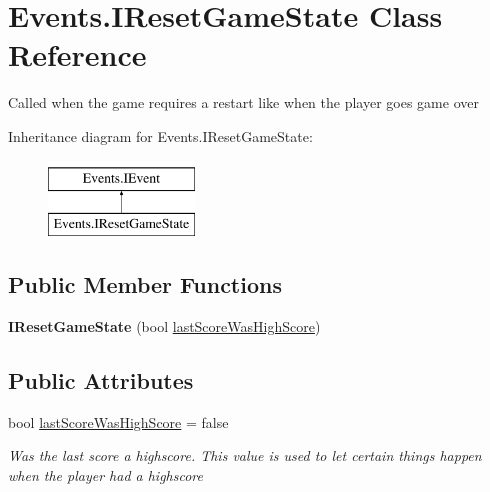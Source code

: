 \hypertarget{class_events_1_1_i_reset_game_state}{}\section{Events.\+I\+Reset\+Game\+State Class Reference}
\label{class_events_1_1_i_reset_game_state}


Called when the game requires a restart like when the player goes game over  


Inheritance diagram for Events.\+I\+Reset\+Game\+State\+:\begin{figure}[H]
\begin{center}
\leavevmode
\includegraphics[height=2.000000cm]{class_events_1_1_i_reset_game_state}
\end{center}
\end{figure}
\subsection*{Public Member Functions}
\begin{DoxyCompactItemize}
\item 
{\bfseries I\+Reset\+Game\+State} (bool \hyperlink{class_events_1_1_i_reset_game_state_a8661bddf2fd9a259303c946252fb8658}{last\+Score\+Was\+High\+Score})\hypertarget{class_events_1_1_i_reset_game_state_a236d60041a6ebe0488d837c6865e60ce}{}\label{class_events_1_1_i_reset_game_state_a236d60041a6ebe0488d837c6865e60ce}

\end{DoxyCompactItemize}
\subsection*{Public Attributes}
\begin{DoxyCompactItemize}
\item 
bool \hyperlink{class_events_1_1_i_reset_game_state_a8661bddf2fd9a259303c946252fb8658}{last\+Score\+Was\+High\+Score} = false
\begin{DoxyCompactList}\small\item\em Was the last score a highscore. This value is used to let certain things happen when the player had a highscore \end{DoxyCompactList}\end{DoxyCompactItemize}


